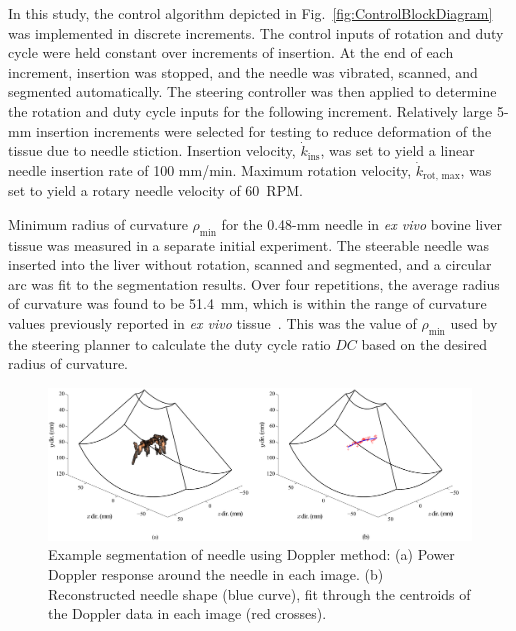 In this study, the control algorithm depicted in Fig.~\ref{fig:ControlBlockDiagram} was implemented in discrete increments. The control inputs of rotation and duty cycle were held constant over increments of insertion. At the end of each increment, insertion was stopped, and the needle was vibrated, scanned, and segmented automatically. The steering controller was then applied to determine the rotation and duty cycle inputs for the following increment. Relatively large 5-mm insertion increments were selected for testing to reduce deformation of the tissue due to needle stiction. Insertion velocity, $\dot{k}_\text{ins}$, was set to yield a linear needle insertion rate of 100 mm/min. Maximum rotation velocity, $\dot{k}_\text{rot, max}$, was set to yield a rotary needle velocity of 60~RPM.

Minimum radius of curvature $\rho_{\text{min}}$ for the 0.48-mm needle in \textit{ex vivo} bovine liver tissue was measured in a separate initial experiment. The steerable needle was inserted into the liver without rotation, scanned and segmented, and a circular arc was fit to the segmentation results. Over four repetitions, the average radius of curvature was found to be 51.4~mm, which is within the range of curvature values previously reported in \textit{ex vivo} tissue~\cite{Majewicz2012}. This was the value of $\rho_{\text{min}}$ used by the steering planner to calculate the duty cycle ratio $DC$ based on the desired radius of curvature.

\begin{figure}[!t]
\centering
\includegraphics[width=\textwidth]{Images/Chapter2/DopplerVisualization/Doppler3D}%
\caption{Example segmentation of needle using Doppler method: (a) Power Doppler response around the needle in each image. (b) Reconstructed needle shape (blue curve), fit through the centroids of the Doppler data in each image (red crosses).}
\label{fig:SegmentationExample}
\end{figure}   
 
